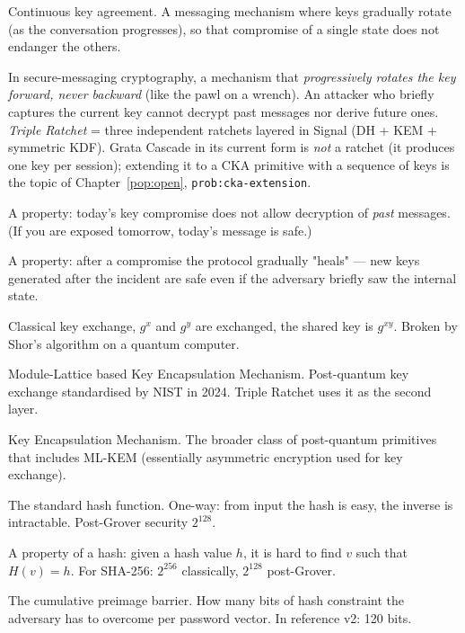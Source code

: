 \documentclass[11pt,a4paper]{article}
\begin{document}
\begin{description}[leftmargin=*, style=nextline]
\item[CKA (Continuous Key Agreement)] Continuous key agreement. A messaging mechanism where keys gradually rotate (as the conversation progresses), so that compromise of a single state does not endanger the others.
\item[Ratchet] In secure-messaging cryptography, a mechanism that \emph{progressively rotates the key forward, never backward} (like the pawl on a wrench). An attacker who briefly captures the current key cannot decrypt past messages nor derive future ones. \emph{Triple Ratchet} = three independent ratchets layered in Signal (DH + KEM + symmetric KDF). Grata Cascade in its current form is \emph{not} a ratchet (it produces one key per session); extending it to a CKA primitive with a sequence of keys is the topic of Chapter~\ref{pop:open}, \texttt{prob:cka-extension}.
\item[Forward Secrecy (FS)] A property: today's key compromise does not allow decryption of \emph{past} messages. (If you are exposed tomorrow, today's message is safe.)
\item[Post-Compromise Security (PCS)] A property: after a compromise the protocol gradually "heals" --- new keys generated after the incident are safe even if the adversary briefly saw the internal state.
\item[Diffie-Hellman (DH, ECDH)] Classical key exchange, $g^x$ and $g^y$ are exchanged, the shared key is $g^{xy}$. Broken by Shor's algorithm on a quantum computer.
\item[ML-KEM] Module-Lattice based Key Encapsulation Mechanism. Post-quantum key exchange standardised by NIST in 2024. Triple Ratchet uses it as the second layer.
\item[KEM] Key Encapsulation Mechanism. The broader class of post-quantum primitives that includes ML-KEM (essentially asymmetric encryption used for key exchange).
\item[SHA-256] The standard hash function. One-way: from input the hash is easy, the inverse is intractable. Post-Grover security $2^{128}$.
\item[Preimage resistance] A property of a hash: given a hash value $h$, it is hard to find $v$ such that $H(v) = h$. For SHA-256: $2^{256}$ classically, $2^{128}$ post-Grover.
\item[$\lambda_\text{preimage}$] The cumulative preimage barrier. How many bits of hash constraint the adversary has to overcome per password vector. In reference v2: 120 bits.

\end{description}
\end{document}
